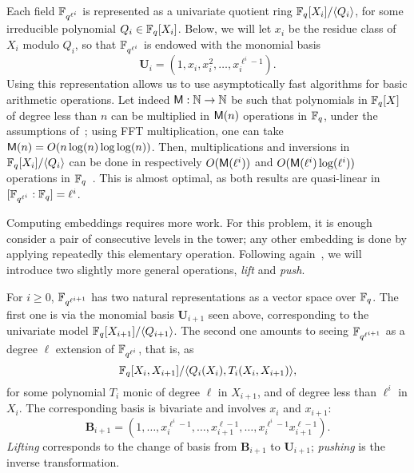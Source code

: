 \documentclass{sig-alternate}
\begin{document}
Each field $\mathbb{F}_{q^{\ell^i}}$ is represented as a univariate quotient ring
$\mathbb{F}_q[X_i]/\langle Q_i\rangle$, for some irreducible polynomial $Q_i
\in \mathbb{F}_q[X_i]$. Below, we will let $x_i$ be the residue class of $X_i$
modulo $Q_i$, so that $\mathbb{F}_{q^{\ell^i}}$ is endowed with the monomial
basis
\begin{equation}
  \label{eq:uni-basis1}
  \mathbf{U}_i = (1,x_{i},x_{i}^2,\ldots,x_{i}^{\ell^{i}-1}).
\end{equation}
Using this representation allows us to use asymptotically fast
algorithms for basic arithmetic operations. Let indeed $\mathsf{M} : \mathbb{N}
\rightarrow \mathbb{N}$ be such that polynomials in $\mathbb{F}_q[X]$ of degree less
than $n$ can be multiplied in $\mathsf{M}(n)$ operations in $\mathbb{F}_q$, under
the assumptions of~\cite[Ch.~8.3]{vzGG}; using FFT multiplication, one
can take $\mathsf{M}(n)=O(n\log (n) \log\log (n))$. Then, multiplications
and inversions in $\mathbb{F}_q[X_i]/\langle Q_i \rangle$ can be done in
respectively $O(\mathsf{M}(\ell^i))$ and $O(\mathsf{M}(\ell^i)\log(\ell^i))$
operations in $\mathbb{F}_q$~\cite[Ch.~9-11]{vzGG}. This is almost optimal, as
both results are quasi-linear in $[\mathbb{F}_{q^{\ell^i}}:\mathbb{F}_q]=\ell^i$.

Computing embeddings requires more work. For this problem, it is
enough consider a pair of consecutive levels in the tower; any other
embedding is done by applying repeatedly this elementary
operation. Following again~\cite{df+schost12}, we will introduce two
slightly more general operations, {\em lift} and {\em push}.

For $i \ge 0$, $\mathbb{F}_{q^{\ell^{i+1}}}$ has two natural representations
as a vector space over $\mathbb{F}_q$. The first one is via the monomial basis
$\mathbf{U}_{i+1}$ seen above, corresponding to the univariate model
$\mathbb{F}_q[X_{i+1}]/ \langle Q_{i+1} \rangle$. The second one amounts to
seeing $\mathbb{F}_{q^{\ell^{i+1}}}$ as a degree $\ell$ extension of
$\mathbb{F}_{q^{\ell^{i}}}$, that is, as
\begin{equation}\label{eq:QiTi}
\mathbb{F}_q[X_i,X_{i+1}]/\langle Q_i(X_i), T_i(X_i,X_{i+1})\rangle,  
\end{equation}
for some polynomial $T_i$ monic of degree $\ell$ in $X_{i+1}$, and of
degree less than $\ell^i$ in $X_i$.  The corresponding basis is
bivariate and involves $x_i$ and $x_{i+1}$:
\begin{equation}
  \label{eq:bi-basis}
  \mathbf{B}_{i+1} = (1,\ldots,x_i^{\ell^i-1},\ldots,x_{i+1}^{\ell-1},\ldots,x_i^{\ell^i-1}x_{i+1}^{\ell-1}).
\end{equation}
{\em Lifting} corresponds to the change of basis from
$\mathbf{B}_{i+1}$ to $\mathbf{U}_{i+1}$; {\em pushing} is the inverse
transformation.
\end{document}

